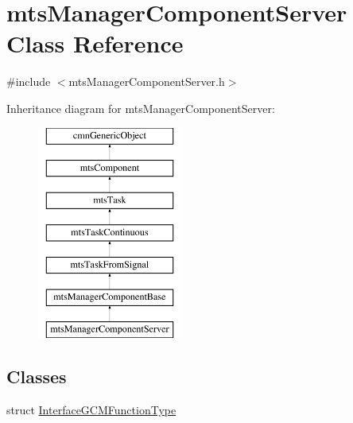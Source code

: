 \hypertarget{classmts_manager_component_server}{}\section{mts\+Manager\+Component\+Server Class Reference}
\label{classmts_manager_component_server}


{\ttfamily \#include $<$mts\+Manager\+Component\+Server.\+h$>$}

Inheritance diagram for mts\+Manager\+Component\+Server\+:\begin{figure}[H]
\begin{center}
\leavevmode
\includegraphics[height=7.000000cm]{d6/d5e/classmts_manager_component_server}
\end{center}
\end{figure}
\subsection*{Classes}
\begin{DoxyCompactItemize}
\item 
struct \hyperlink{structmts_manager_component_server_1_1_interface_g_c_m_function_type}{Interface\+G\+C\+M\+Function\+Type}
\end{DoxyCompactItemize}

